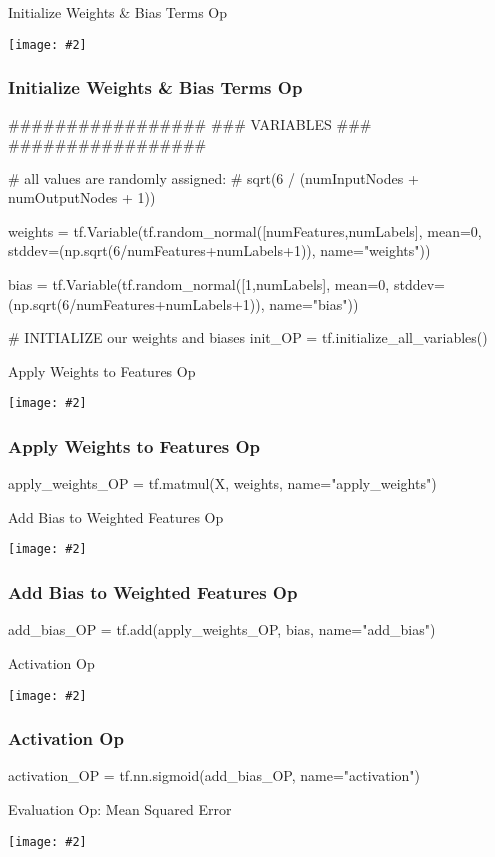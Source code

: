 \documentclass[14pt]{beamer}
\newcommand {\framedgraphic}[2] { %
    \begin{frame}{#1}
        \begin{center}
            \texttt{[image: \#2]}
        \end{center}
    \end{frame}
}
\begin{document}
\framedgraphic{Initialize Weights \& Bias Terms Op}{1-initialization.png}

\begin{frame}[fragile]
  \frametitle{Initialize Weights \& Bias Terms Op}
  \begin{python}
#################
### VARIABLES ###
#################

# all values are randomly assigned:
# sqrt(6 / (numInputNodes + numOutputNodes + 1))

weights = tf.Variable(tf.random_normal([numFeatures,numLabels],
          mean=0,
          stddev=(np.sqrt(6/numFeatures+numLabels+1)),
          name="weights"))

bias = tf.Variable(tf.random_normal([1,numLabels],
       mean=0,
       stddev=(np.sqrt(6/numFeatures+numLabels+1)),
       name="bias"))


# INITIALIZE our weights and biases
init_OP = tf.initialize_all_variables()
  \end{python}
\end{frame}


\framedgraphic{Apply Weights to Features Op}{2-apply-weights.png}

\begin{frame}[fragile]
  \frametitle{Apply Weights to Features Op}
  \begin{python}
apply_weights_OP = tf.matmul(X, weights, name="apply_weights")
  \end{python}
\end{frame}


\framedgraphic{Add Bias to Weighted Features Op}{3-add-bias.png}

\begin{frame}[fragile]
  \frametitle{Add Bias to Weighted Features Op}
  \begin{python}
add_bias_OP = tf.add(apply_weights_OP, bias, name="add_bias") 
  \end{python}
\end{frame}


\framedgraphic{Activation Op}{4-apply-sigmoid.png}

\begin{frame}[fragile]
  \frametitle{Activation Op}
  \begin{python}
activation_OP = tf.nn.sigmoid(add_bias_OP, name="activation")
  \end{python}
\end{frame}


\framedgraphic{Evaluation Op: Mean Squared Error}{5-loss-function.png}
\end{document}
